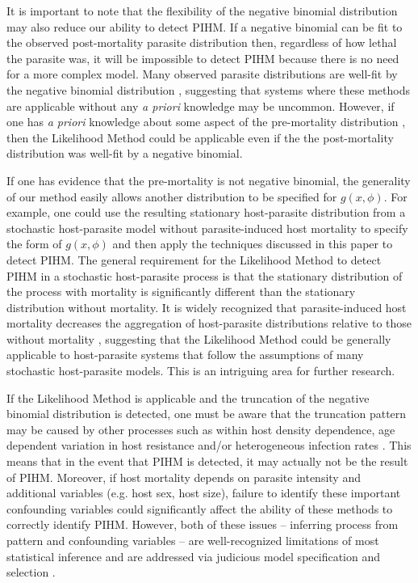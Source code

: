 \documentclass[12pt, a4paper]{article}
\begin{document}
It is important to note that the flexibility of the negative binomial distribution may also reduce our ability to detect PIHM. If
a negative binomial can be fit to the observed post-mortality parasite
distribution then, regardless of how lethal the parasite was, it will be
impossible to detect PIHM because there is no need for a more complex model.
Many observed parasite distributions are well-fit by the negative binomial distribution \citep{Shaw1998}, suggesting
that systems where these methods are applicable without any \emph{a priori} knowledge may be uncommon. However, if one has \emph{a priori} knowledge about some aspect of the pre-mortality distribution \citep[e.g. assumes/knows the value of $k_p$,][]{Ferguson2011}, then the Likelihood Method could be applicable even if the the post-mortality distribution was well-fit by a negative binomial.

If one has evidence that the pre-mortality is not negative binomial, the generality of our method easily allows another distribution to be specified for $g(x, \phi)$. For example, one could use the
resulting stationary host-parasite distribution from a stochastic host-parasite
model without parasite-induced host mortality \citep{Anderson1982a} to specify
the form of $g(x, \phi)$ and then apply the techniques discussed
in this paper to detect PIHM.  The general requirement
for the Likelihood Method to detect PIHM in a stochastic host-parasite process
is that the stationary distribution of the process with
mortality is significantly different than the stationary distribution without mortality.
It is widely recognized that parasite-induced host mortality decreases the
aggregation of host-parasite distributions relative to those without mortality
\citep{Barbour2000}, suggesting that the Likelihood Method could be generally applicable to host-parasite systems that follow the assumptions of many stochastic host-parasite models.  This is an intriguing area for further research.

If the Likelihood Method is applicable and the truncation of the negative binomial distribution is detected, one must be aware that the truncation pattern may be caused by other
processes such as within host density dependence, age dependent variation in host
resistance and/or heterogeneous infection rates \citep{Anderson1982a,Rousset1996, McCallum2000a}. This means that in the event
that PIHM is detected, it may actually not be the result of PIHM.  Moreover, if host mortality depends on parasite intensity and additional variables (e.g. host sex, host size), failure to identify these important confounding variables could significantly affect the ability of these methods to correctly identify PIHM. However, both of these issues -- inferring process from pattern and confounding variables -- are well-recognized limitations of most statistical inference and are addressed via judicious model specification and selection \citep{Seber2003}.
\end{document}

